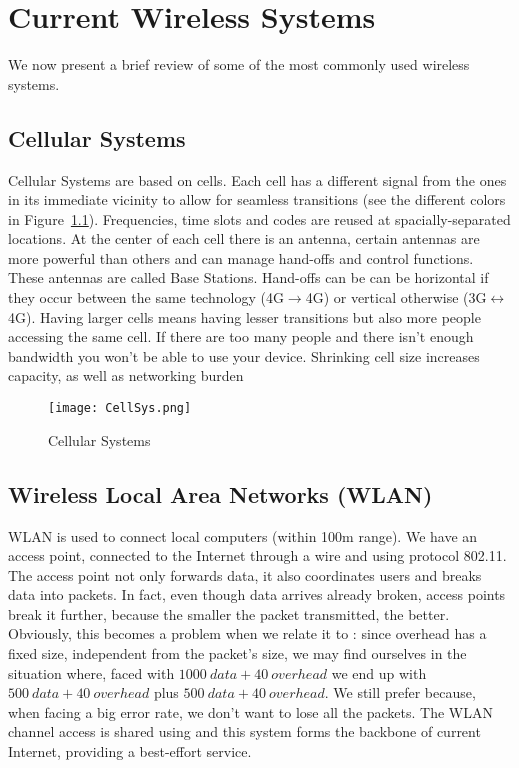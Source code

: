 \chapter{Current Wireless Systems}
We now present a brief review of some of the most commonly used wireless 
systems.

\section{Cellular Systems}
Cellular Systems are based on cells. Each cell has a different signal 
from the ones in its immediate vicinity to allow for seamless transitions (see 
the different colors in Figure~\ref{fig:cws:CellSys}). Frequencies, time 
slots and codes are reused at spacially-separated locations. At the center of 
each cell there is an antenna, certain antennas are more powerful than others 
and can manage hand-offs and control functions. These antennas are called Base 
Stations. Hand-offs can be can be horizontal if they occur between the same 
technology (4G$\to$4G) or vertical otherwise 
(3G$\leftrightarrow$4G).
Having larger cells means having lesser transitions but also more people 
accessing the same cell. If there are too many people and there isn't enough 
bandwidth you won't be able to use your device. Shrinking cell size increases 
capacity, as well as networking burden
\begin{figure}[!h]
  \centering
  \texttt{[image: CellSys.png]}
  \caption{Cellular Systems}				
  \label{fig:cws:CellSys}
\end{figure}

\section{Wireless Local Area Networks (WLAN)}
WLAN is used to connect local computers (within 100m range). We have an 
access point, connected to the Internet through a wire and using protocol 
802.11. The access point not only forwards data, it also coordinates users and 
breaks data into packets. In fact, even though data arrives already broken, 
access points break it further, because the smaller the packet transmitted, the 
better. Obviously, this becomes a problem when we relate it to
: since overhead has a fixed size, independent from the
packet's size, we may find ourselves in the situation where, faced with
$1000\ data + 40\ overhead$ we end up with $500\ data + 40\ overhead$ plus
$500\ data + 40\ overhead$. We still prefer  because, when
facing a big error rate, we don't want to lose all the packets.
The WLAN channel access is shared using  and this system
forms the backbone of current Internet, providing a best-effort service.

